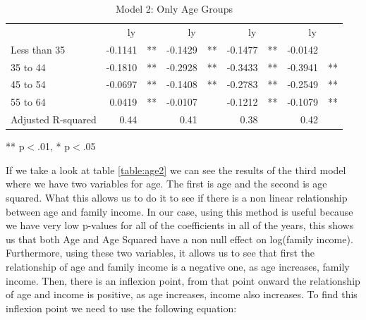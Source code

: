 \documentclass[12pt]{article}
\begin{document}
\begin{spacing}{1.5}
\begin{table}[!h]
\caption{Model 2: Only Age Groups}
\centering
\begin{tabular}{lllllllll}
\cline{1-9}
\multicolumn{1}{r}{} &
  \multicolumn{2}{c}{ly} &
  \multicolumn{2}{c}{ly} &
  \multicolumn{2}{c}{ly} &
  \multicolumn{2}{c}{ly} \\
\cline{1-9}
\multicolumn{1}{l}{Less than 35} &
  \multicolumn{1}{r}{-0.1141} &
  \multicolumn{1}{l}{**} &
  \multicolumn{1}{r}{-0.1429} &
  \multicolumn{1}{l}{**} &
  \multicolumn{1}{r}{-0.1477} &
  \multicolumn{1}{l}{**} &
  \multicolumn{1}{r}{-0.0142} &
  \multicolumn{1}{l}{} \\
\multicolumn{1}{l}{35 to 44} &
  \multicolumn{1}{r}{-0.1810} &
  \multicolumn{1}{l}{**} &
  \multicolumn{1}{r}{-0.2928} &
  \multicolumn{1}{l}{**} &
  \multicolumn{1}{r}{-0.3433} &
  \multicolumn{1}{l}{**} &
  \multicolumn{1}{r}{-0.3941} &
  \multicolumn{1}{l}{**} \\
\multicolumn{1}{l}{45 to 54} &
  \multicolumn{1}{r}{-0.0697} &
  \multicolumn{1}{l}{**} &
  \multicolumn{1}{r}{-0.1408} &
  \multicolumn{1}{l}{**} &
  \multicolumn{1}{r}{-0.2783} &
  \multicolumn{1}{l}{**} &
  \multicolumn{1}{r}{-0.2549} &
  \multicolumn{1}{l}{**} \\
\multicolumn{1}{l}{55 to 64} &
  \multicolumn{1}{r}{0.0419} &
  \multicolumn{1}{l}{**} &
  \multicolumn{1}{r}{-0.0107} &
  \multicolumn{1}{l}{} &
  \multicolumn{1}{r}{-0.1212} &
  \multicolumn{1}{l}{**} &
  \multicolumn{1}{r}{-0.1079} &
  \multicolumn{1}{l}{**} \\
\multicolumn{1}{l}{Adjusted R-squared} &
  \multicolumn{1}{r}{0.44} &
  \multicolumn{1}{l}{} &
  \multicolumn{1}{r}{0.41} &
  \multicolumn{1}{l}{} &
  \multicolumn{1}{r}{0.38} &
  \multicolumn{1}{l}{} &
  \multicolumn{1}{r}{0.42} &
  \multicolumn{1}{l}{} \\
\cline{1-9}
\end{tabular}

\footnotesize{
** p$<$.01, * p$<$.05
}
\label{table:age1}
\end{table}

If we take a look at table \ref{table:age2} we can see the results of the third model where we have two variables for age. The first is age and the second is age squared. What this allows us to do it to see if there is a non linear relationship between age and family income. In our case, using this method is useful because we have very low p-values for all of the coefficients in all of the years, this shows us that both Age and Age Squared have a non null effect on log(family income). Furthermore, using these two variables, it allows us to see that first the relationship of age and family income is a negative one, as age increases, family income. Then, there is an inflexion point, from that point onward the relationship of age and income is positive, as age increases, income also increases. To find this inflexion point we need to use the following equation:


\end{spacing}
\end{document}
